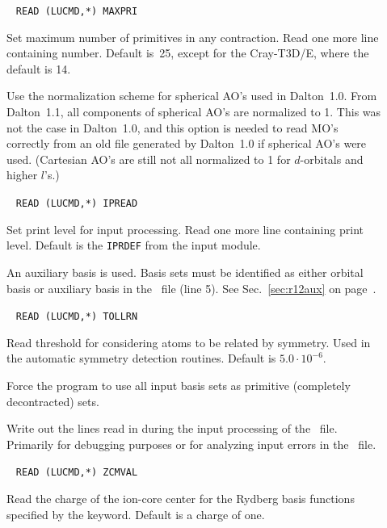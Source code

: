 \begin{description}
\item[]\verb| |\newline
\verb|READ (LUCMD,*) MAXPRI|

Set maximum number of primitives in any
contraction.  Read one more line containing number.  Default
is~25, except for the Cray-T3D/E, where the default is 14.


\item[] Use the normalization scheme for spherical AO's used in Dalton~1.0.
From Dalton~1.1, all components of spherical AO's are normalized to 1.
This was not the case in Dalton~1.0, and this option is needed to read
MO's correctly from an old file generated by Dalton~1.0 if spherical AO's were used.
(Cartesian AO's are still not all normalized to 1 for $d$-orbitals and higher $l$'s.)

\item[]\verb| |\newline
\verb|READ (LUCMD,*) IPREAD|

Set print level for input processing.  Read one more line containing
print level. Default is the \verb|IPRDEF| from the  input
module.

\item[] An auxiliary basis is used.
Basis sets must be identified as either orbital basis or
auxiliary basis in the \molinp\ file (line 5).
See Sec.~\ref{sec:r12aux} on page~\pageref{sec:r12aux}.

\item[]\verb| |\newline
\verb|READ (LUCMD,*) TOLLRN|

Read threshold for considering atoms to be related by symmetry. Used
in the automatic symmetry detection routines. Default is $5.0\cdot
10^{-6}$.

\item[] Force the program to use all input basis sets as primitive (completely decontracted) sets.

\item[] Write out the lines read in during the input
  processing of the \molinp\ file. Primarily for debugging
  purposes or for analyzing input errors in the \molinp\
  file.

\item[]\verb| |\newline
\verb|READ (LUCMD,*) ZCMVAL|

Read the charge of the ion-core center for the Rydberg basis functions specified
by the \Key{CM FUN} keyword. Default is a charge of one.

\end{description}

